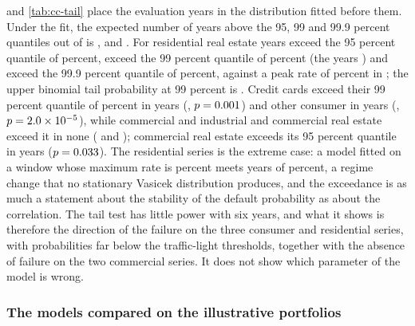  and \cref{tab:cc-tail} place the evaluation years in the distribution fitted before them. Under the fit, the expected
number of years above the 95, 99 and 99.9 percent quantiles out of \ccEvYears{} is \ccExpNF{}, \ccExpNN{} and \ccExpNNN{}. For residential real
estate \ccExcNFRes{} years exceed the 95 percent quantile of \ccQNFRes{} percent, \ccExcNNRes{} exceed the 99 percent quantile of
\ccQNNRes{} percent (the years \ccYrsNNRes{}) and \ccExcNNNRes{} exceed the 99.9 percent quantile of \ccQNNNRes{} percent, against a peak rate
of \ccPeakRateRes{} percent in \ccPeakYearRes{}; the upper binomial tail probability at 99 percent is \ccPNNRes{}. Credit cards
exceed their 99 percent quantile of \ccQNNCard{} percent in \ccExcNNCard{} years (\ccYrsNNCard{}, $p=0.001$) and other consumer in
\ccExcNNOth{} years (\ccYrsNNOth{}, $p=2.0\times10^{-5}$), while commercial and industrial and commercial real estate exceed it in none
(\ccExcNNCi{} and \ccExcNNCre{}); commercial real estate exceeds its 95 percent quantile in \ccExcNFCre{} years ($p=0.033$). The
residential series is the extreme case: a model fitted on a window whose maximum rate is \ccFitMaxRateRes{} percent meets years of
\ccPeakRateRes{} percent, a regime change that no stationary Vasicek distribution produces, and the exceedance is as much a statement
about the stability of the default probability as about the correlation. The tail test has little power with six years, and what it
shows is therefore the direction of the failure on the three consumer and residential series, with probabilities far below the
traffic-light thresholds, together with the absence of failure on the two commercial series. It does not show which parameter of the model
is wrong.

\subsubsection{The models compared on the illustrative portfolios}



